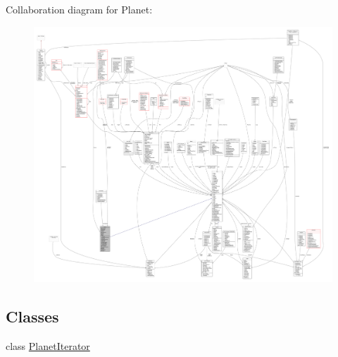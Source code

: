 Collaboration diagram for Planet\+:
\nopagebreak
\begin{figure}[H]
\begin{center}
\leavevmode
\includegraphics[width=350pt]{d7/d97/classPlanet__coll__graph}
\end{center}
\end{figure}
\subsection*{Classes}
\begin{DoxyCompactItemize}
\item 
class \hyperlink{classPlanet_1_1PlanetIterator}{Planet\+Iterator}
\end{DoxyCompactItemize}
